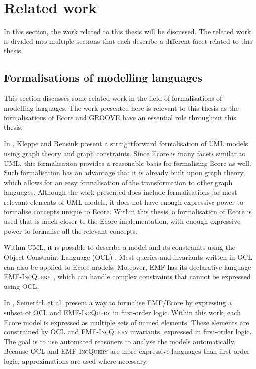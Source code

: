 \section{Related work}
\label{sec:introduction:related_work}
In this section, the work related to this thesis will be discussed. The related work is divided into multiple sections that each describe a different facet related to this thesis.


\subsection{Formalisations of modelling languages}
\label{subsec:introduction:related_work:formalisations_of_modelling_languages}
This section discusses some related work in the field of formalisations of modelling languages. The work presented here is relevant to this thesis as the formalisations of Ecore and GROOVE have an essential role throughout this thesis.

In \cite{kleppe_uml-graph-semantics}, Kleppe and Rensink present a straightforward formalisation of UML models using graph theory and graph constraints. Since Ecore is many facets similar to UML, this formalisation provides a reasonable basis for formalising Ecore as well. Such formalisation has an advantage that it is already built upon graph theory, which allows for an easy formalisation of the transformation to other graph languages. Although the work presented does include formalisations for most relevant elements of UML models, it does not have enough expressive power to formalise concepts unique to Ecore. Within this thesis, a formalisation of Ecore is used that is much closer to the Ecore implementation, with enough expressive power to formalise all the relevant concepts.

Within UML, it is possible to describe a model and its constraints using the Object Constraint Language (OCL) \cite{ocl_spec_2014}. Most queries and invariants written in OCL can also be applied to Ecore models. Moreover, EMF has its declarative language EMF-\textsc{IncQuery} \cite{emf_incquery-guindon_2016}, which can handle complex constraints that cannot be expressed using OCL. 

In \cite{semerath-validation_dsl}, Semeráth et al. present a way to formalise EMF/Ecore by expressing a subset of OCL and EMF-\textsc{IncQuery} in first-order logic. Within this work, each Ecore model is expressed as multiple sets of named elements. These elements are constrained by OCL and EMF-\textsc{IncQuery} invariants, expressed in first-order logic. The goal is to use automated reasoners to analyse the models automatically. Because OCL and EMF-\textsc{IncQuery} are more expressive languages than first-order logic, approximations are used where necessary.

